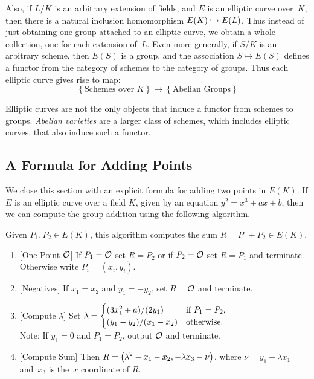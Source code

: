 Also, if $L/K$ is an arbitrary extension of fields, and $E$ is an
elliptic curve over~$K$, then there is a natural inclusion
homomorphism $E(K)\hookrightarrow E(L)$.  Thus instead of just obtaining one group
attached to an elliptic curve, we obtain a whole collection, one for
each extension of~$L$.  Even more generally, if $S/K$ is an arbitrary
scheme, then $E(S)$ is a group, and the association $S\mapsto E(S)$
defines a functor from the category of schemes to the category of
groups.  Thus each elliptic curve gives rise to map:
$$
 \left\{\text{Schemes over $K$}\right\} \longrightarrow
\left\{\text{Abelian Groups}\right\}
$$

\begin{remark}
	Elliptic curves are not the only objects that induce
	a functor from schemes to groups.
	\emph{Abelian varieties} are a larger class of
	schemes, which includes elliptic curves,
    that also induce such a functor.
\end{remark}

\subsection{A Formula for Adding Points}

We close this section with an explicit formula for
adding two points in $E(K)$.
If $E$ is an elliptic curve over a field $K$,
given by an equation $y^2=x^3+ax+b$, then we
can compute the group addition using the following
algorithm.
\begin{algorithm}\label{alg:grouplaw}
Given $P_1, P_2\in E(K)$,
this algorithm computes the sum $R=P_1+P_2 \in E(K)$.
{\sf \begin{enumerate}
\item{}[One Point $\mathcal{O}$] If $P_1=\mathcal{O}$ set $R=P_2$ or if $P_2=\mathcal{O}$ set $R=P_1$
and terminate.  Otherwise write $P_i=(x_i,y_i)$.
\item{}[Negatives]  If $x_1 = x_2$ and $y_1 = -y_2$, set $R=\mathcal{O}$ and terminate.
\item{}[Compute $\lambda$]\label{alg:grouplaw_3}
Set $\displaystyle \lambda = \begin{cases}
 (3x_1^2+a)/(2y_1) & \text{if }P_1 = P_2,\\
(y_1-y_2)/(x_1-x_2) & \text{otherwise.}
\end{cases}$\\
Note: If $y_1=0$ and $P_1=P_2$, output $\mathcal{O}$ and terminate.
\item{}[Compute Sum]\label{alg:grouplaw_4}  Then
$R = \displaystyle \left(\lambda^2 -x_1 - x_2, -\lambda x_3 - \nu\right)$,
where $\nu = y_1 - \lambda x_1$ and~$x_3$ is the~$x$ coordinate of $R$.
\end{enumerate}}
\end{algorithm}

